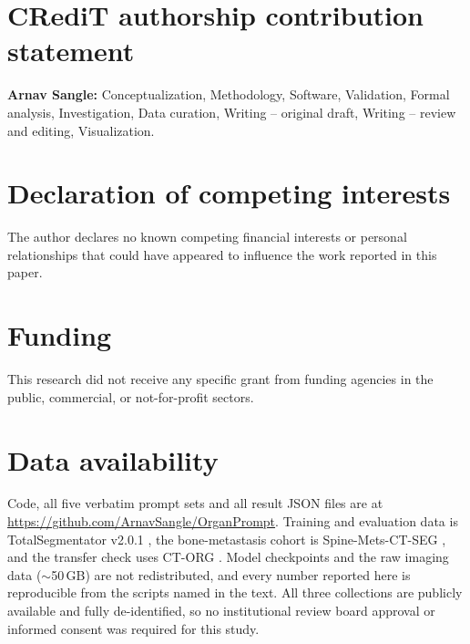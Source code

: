 \documentclass[10pt]{article}
\begin{document}
\section*{CRediT authorship contribution statement}
\textbf{Arnav Sangle:} Conceptualization, Methodology, Software, Validation,
Formal analysis, Investigation, Data curation, Writing -- original draft,
Writing -- review and editing, Visualization.

\section*{Declaration of competing interests}
The author declares no known competing financial interests or personal
relationships that could have appeared to influence the work reported in this
paper.

\section*{Funding}
This research did not receive any specific grant from funding agencies in the
public, commercial, or not-for-profit sectors.

\section*{Data availability}
Code, all five verbatim prompt sets and all result JSON files are at
\url{https://github.com/ArnavSangle/OrganPrompt}. Training and evaluation data is
TotalSegmentator v2.0.1 \cite{wasserthal2023totalsegdataset}, the bone-metastasis
cohort is Spine-Mets-CT-SEG \cite{pieper2024spinemets}, and the transfer check
uses CT-ORG \cite{rister2020ctorg}. Model checkpoints and the raw imaging data
($\sim$50\,GB) are not redistributed, and every number reported here is
reproducible from the scripts named in the text. All three collections are
publicly available and fully de-identified, so no institutional review board
approval or informed consent was required for this study.

%
\end{document}
